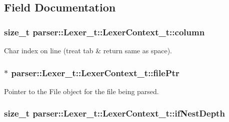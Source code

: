 \subsection{Field Documentation}
\subsubsection[{\texorpdfstring{column}{column}}]{\setlength{\rightskip}{0pt plus 5cm}size\+\_\+t parser\+::\+Lexer\+\_\+t\+::\+Lexer\+Context\+\_\+t\+::column}\hypertarget{structparser_1_1_lexer__t_1_1_lexer_context__t_ab02b7a88d4d2f6830ff14a3bd067b528}{}\label{structparser_1_1_lexer__t_1_1_lexer_context__t_ab02b7a88d4d2f6830ff14a3bd067b528}


Char index on line (treat tab \& return same as space). 

\subsubsection[{\texorpdfstring{file\+Ptr}{filePtr}}]{$\ast$ parser\+::\+Lexer\+\_\+t\+::\+Lexer\+Context\+\_\+t\+::file\+Ptr}\hypertarget{structparser_1_1_lexer__t_1_1_lexer_context__t_a15e7110763ce80683b87d236c138456c}{}\label{structparser_1_1_lexer__t_1_1_lexer_context__t_a15e7110763ce80683b87d236c138456c}


Pointer to the File object for the file being parsed. 

\subsubsection[{\texorpdfstring{if\+Nest\+Depth}{ifNestDepth}}]{\setlength{\rightskip}{0pt plus 5cm}size\+\_\+t parser\+::\+Lexer\+\_\+t\+::\+Lexer\+Context\+\_\+t\+::if\+Nest\+Depth}\hypertarget{structparser_1_1_lexer__t_1_1_lexer_context__t_ab80a60c09bc6d50679883fb42c6dc6bf}{}\label{structparser_1_1_lexer__t_1_1_lexer_context__t_ab80a60c09bc6d50679883fb42c6dc6bf}


